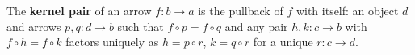 The \textbf{kernel pair} of an arrow $f: b \to a$ is the pullback of $f$ with itself: an object $d$ and arrows $p, q: d \to b$ such that $f \circ p = f \circ q$ and any pair $h, k: c \to b$ with $f \circ h = f \circ k$ factors uniquely as $h = p \circ r$, $k = q \circ r$ for a unique $r: c \to d$.